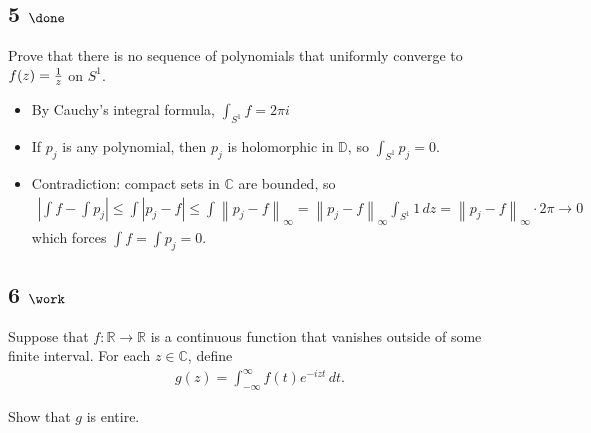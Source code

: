\hypertarget{done}{%
\subsection{\texorpdfstring{5
\(\done\)}{5 \textbackslash done}}\label{done}}

Prove that there is no sequence of polynomials that uniformly converge
to \(f(z) = {1\over z}\) on \(S^1\).

\begin{solution}

\hfill

\begin{concept}

\hfill

\end{concept}

\begin{itemize}
\tightlist
\item
  By Cauchy's integral formula, \(\int_{S^1} f = 2\pi i\)
\item
  If \(p_j\) is any polynomial, then \(p_j\) is holomorphic in
  \({\mathbb{D}}\), so \(\int_{S^1} p_j = 0\).
\item
  Contradiction: compact sets in \({\mathbb{C}}\) are bounded, so
  \begin{align*}
  {\left\lvert {\int f - \int p_j} \right\rvert} \leq \int {\left\lvert {p_j - f} \right\rvert} \leq \int {\left\lVert {p_j - f} \right\rVert}_\infty  = {\left\lVert {p_j - f} \right\rVert}_\infty \int_{S^1} 1 \,dz = {\left\lVert {p_j-f} \right\rVert}_\infty \cdot 2\pi \to 0
  \end{align*}
  which forces \(\int f = \int p_j = 0\).
\end{itemize}

\end{solution}

\hypertarget{work-32}{%
\subsection{\texorpdfstring{6
\(\work\)}{6 \textbackslash work}}\label{work-32}}

Suppose that \(f: {\mathbb{R}}\to{\mathbb{R}}\) is a continuous function
that vanishes outside of some finite interval. For each
\(z\in {\mathbb{C}}\), define
\begin{align*}
g(z) = \int_{-\infty}^\infty f(t) e^{-izt} \,dt
.\end{align*}

Show that \(g\) is entire.


